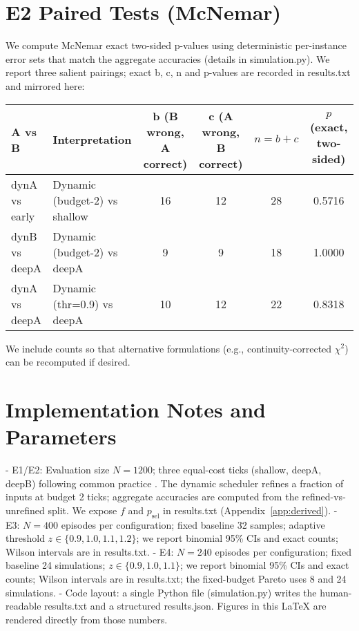 \section{E2 Paired Tests (McNemar)}
We compute McNemar exact two-sided p-values using deterministic per-instance error sets that match the aggregate accuracies (details in simulation.py). We report three salient pairings; exact b, c, n and p-values are recorded in results.txt and mirrored here:
\begin{center}
\begin{adjustbox}{width=\linewidth}
\begin{tabular}{l l c c c c}
\toprule
A vs B & Interpretation & b (B wrong, A correct) & c (A wrong, B correct) & $n=b+c$ & $p$ (exact, two-sided) \\
\midrule
dynA vs early & Dynamic (budget-2) vs shallow & 16 & 12 & 28 & 0.5716 \\
dynB vs deepA & Dynamic (budget-2) vs deepA    & 9  & 9  & 18 & 1.0000 \\
dynA vs deepA & Dynamic (thr=0.9) vs deepA     & 10 & 12 & 22 & 0.8318 \\
\bottomrule
\end{tabular}
\end{adjustbox}
\end{center}
We include counts so that alternative formulations (e.g., continuity-corrected $\chi^2$) can be recomputed if desired.

\section{Implementation Notes and Parameters}
\label{app:impl}
- E1/E2: Evaluation size $N=1200$; three equal-cost ticks (shallow, deepA, deepB) following common practice \cite{Huang2018MSDNet,Wang2018SkipNet}. The dynamic scheduler refines a fraction of inputs at budget 2 ticks; aggregate accuracies are computed from the refined-vs-unrefined split. We expose $f$ and $p_{\mathrm{sel}}$ in results.txt (Appendix~\ref{app:derived}).
- E3: $N=400$ episodes per configuration; fixed baseline 32 samples; adaptive threshold $z \in \{0.9,1.0,1.1,1.2\}$; we report binomial 95\% CIs and exact counts; Wilson intervals are in results.txt.
- E4: $N=240$ episodes per configuration; fixed baseline 24 simulations; $z \in \{0.9,1.0,1.1\}$; we report binomial 95\% CIs and exact counts; Wilson intervals are in results.txt; the fixed-budget Pareto uses 8 and 24 simulations.
- Code layout: a single Python file (simulation.py) writes the human-readable results.txt and a structured results.json. Figures in this LaTeX are rendered directly from those numbers.

